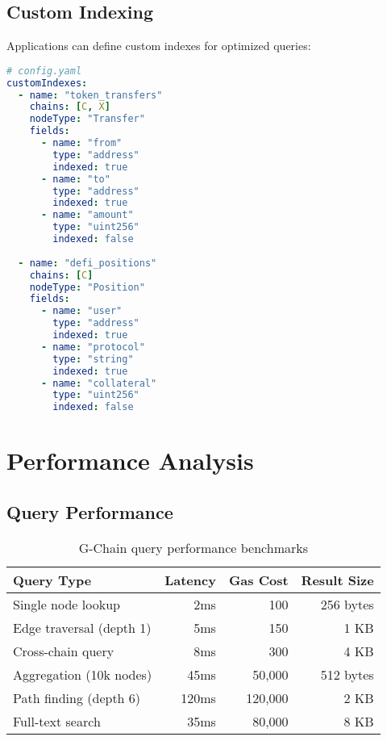 \documentclass[11pt,a4paper]{article}
\begin{document}
\subsection{Custom Indexing}

Applications can define custom indexes for optimized queries:

\begin{lstlisting}[language=YAML, basicstyle=\small\ttfamily]
# config.yaml
customIndexes:
  - name: "token_transfers"
    chains: [C, X]
    nodeType: "Transfer"
    fields:
      - name: "from"
        type: "address"
        indexed: true
      - name: "to"
        type: "address"
        indexed: true
      - name: "amount"
        type: "uint256"
        indexed: false
    
  - name: "defi_positions"
    chains: [C]
    nodeType: "Position"
    fields:
      - name: "user"
        type: "address"
        indexed: true
      - name: "protocol"
        type: "string"
        indexed: true
      - name: "collateral"
        type: "uint256"
        indexed: false
\end{lstlisting}

\section{Performance Analysis}

\subsection{Query Performance}

\begin{table}[h]
\centering
\begin{tabular}{@{}lrrr@{}}
\toprule
\textbf{Query Type} & \textbf{Latency} & \textbf{Gas Cost} & \textbf{Result Size} \\ \midrule
Single node lookup & 2ms & 100 & 256 bytes \\
Edge traversal (depth 1) & 5ms & 150 & 1 KB \\
Cross-chain query & 8ms & 300 & 4 KB \\
Aggregation (10k nodes) & 45ms & 50,000 & 512 bytes \\
Path finding (depth 6) & 120ms & 120,000 & 2 KB \\
Full-text search & 35ms & 80,000 & 8 KB \\ \bottomrule
\end{tabular}
\caption{G-Chain query performance benchmarks}
\end{table}
\end{document}
